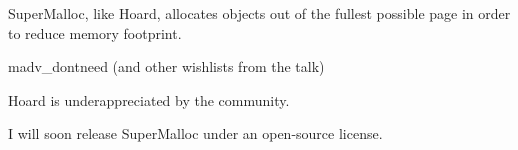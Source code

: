 \documentclass[pldi]{sigplanconf-pldi15}
\begin{document}

SuperMalloc, like Hoard, allocates objects out of the fullest possible page in order to reduce memory footprint.

madv\_dontneed (and other wishlists from the talk)

Hoard is underappreciated by the community.

I will soon release SuperMalloc under an open-source license.

{\raggedright


}

\end{document}
